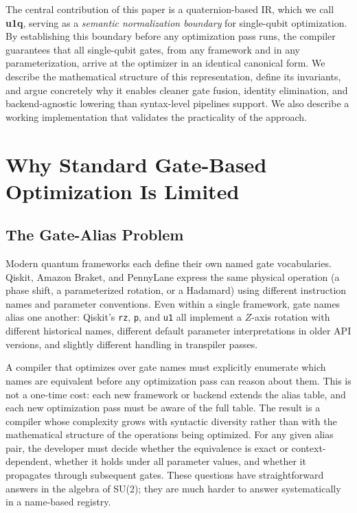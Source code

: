 \documentclass[conference]{IEEEtran}
\begin{document}
The central contribution of this paper is a quaternion-based IR, which we call \textbf{u1q},
serving as a \textit{semantic normalization boundary} for single-qubit optimization. By
establishing this boundary before any optimization pass runs, the compiler guarantees that
all single-qubit gates, from any framework and in any parameterization, arrive at the
optimizer in an identical canonical form. We describe the mathematical structure of this
representation, define its invariants, and argue concretely why it enables cleaner gate
fusion, identity elimination, and backend-agnostic lowering than syntax-level pipelines
support. We also describe a working implementation that validates the practicality of the
approach.

\section{Why Standard Gate-Based Optimization Is Limited}

\subsection{The Gate-Alias Problem}

Modern quantum frameworks each define their own named gate vocabularies. Qiskit, Amazon
Braket, and PennyLane express the same physical operation (a phase shift, a
parameterized rotation, or a Hadamard) using different instruction names and parameter
conventions. Even within a single framework, gate names alias one another: Qiskit's
\texttt{rz}, \texttt{p}, and \texttt{u1} all implement a $Z$-axis rotation with different
historical names, different default parameter interpretations in older API versions, and
slightly different handling in transpiler passes.

A compiler that optimizes over gate names must explicitly enumerate which names are
equivalent before any optimization pass can reason about them. This is not a one-time cost:
each new framework or backend extends the alias table, and each new optimization pass
must be aware of the full table. The result is a compiler whose complexity grows with
syntactic diversity rather than with the mathematical structure of the operations being
optimized. For any given alias pair, the developer must decide whether the equivalence is
exact or context-dependent, whether it holds under all parameter values, and whether it
propagates through subsequent gates. These questions have straightforward answers in the
algebra of SU(2); they are much harder to answer systematically in a name-based registry.
\end{document}
